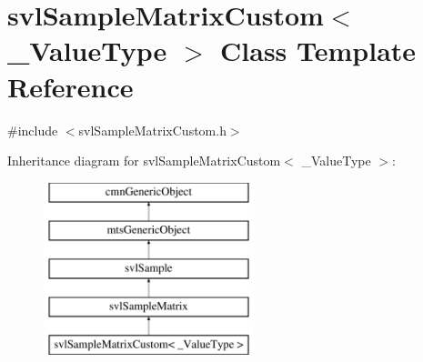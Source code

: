 \hypertarget{classsvl_sample_matrix_custom}{\section{svl\-Sample\-Matrix\-Custom$<$ \-\_\-\-Value\-Type $>$ Class Template Reference}
\label{classsvl_sample_matrix_custom}
}


{\ttfamily \#include $<$svl\-Sample\-Matrix\-Custom.\-h$>$}

Inheritance diagram for svl\-Sample\-Matrix\-Custom$<$ \-\_\-\-Value\-Type $>$\-:\begin{figure}[H]
\begin{center}
\leavevmode
\includegraphics[height=5.000000cm]{d7/d0e/classsvl_sample_matrix_custom}
\end{center}
\end{figure}
